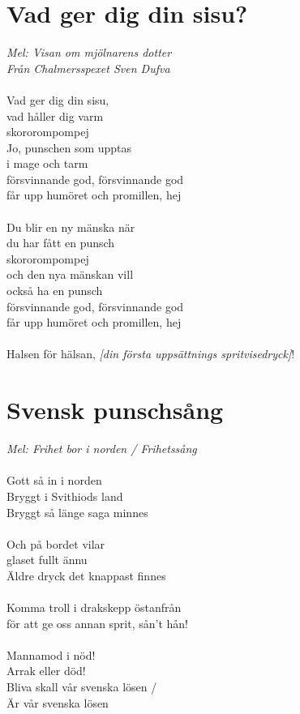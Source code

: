 \documentclass[a5paper,15pt]{article}
\begin{document}
\section{Vad ger dig din sisu?}
\emph{Mel: Visan om mjölnarens dotter \\
Från Chalmersspexet Sven Dufva}\\
\\
Vad ger dig din sisu, \\vad håller dig varm\\
skororompompej\\
Jo, punschen som upptas \\i mage och tarm\\
försvinnande god, försvinnande god\\
får upp humöret och promillen, hej\\
\\
Du blir en ny mänska när \\du har fått en punsch\\
skororompompej\\
och den nya mänskan vill \\också ha en punsch\\
försvinnande god, försvinnande god\\
får upp humöret och promillen, hej\\
\\
Halsen för hälsan, \emph{[din första uppsättnings spritvisedryck]}!

\section{Svensk punschsång}
\emph{Mel: Frihet bor i norden / Frihetssång}\\
\\
Gott så in i norden\\
Bryggt i Svithiods land\\
Bryggt så länge saga minnes\\
\\
Och på bordet vilar\\
glaset fullt ännu\\
Äldre dryck det knappast finnes\\
\\
Komma troll i drakskepp östanfrån\\
för att ge oss annan sprit, sån't hån!\\
\\
Mannamod i nöd!\\
Arrak eller död!\\
Bliva skall vår svenska lösen / \\Är vår svenska lösen
\end{document}
